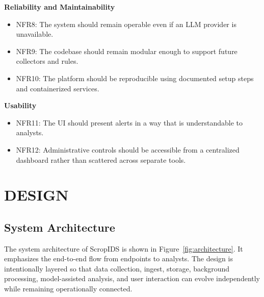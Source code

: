 \documentclass[12pt,a4paper]{article}
\begin{document}
\textbf{Reliability and Maintainability}
\begin{itemize}
    \item NFR8: The system should remain operable even if an LLM provider is unavailable.
    \item NFR9: The codebase should remain modular enough to support future collectors and rules.
    \item NFR10: The platform should be reproducible using documented setup steps and containerized services.
\end{itemize}

\textbf{Usability}
\begin{itemize}
    \item NFR11: The UI should present alerts in a way that is understandable to analysts.
    \item NFR12: Administrative controls should be accessible from a centralized dashboard rather than scattered across separate tools.
\end{itemize}

\clearpage
\section{DESIGN}

\subsection{System Architecture}
The system architecture of ScropIDS is shown in Figure~\ref{fig:architecture}. It emphasizes the end-to-end flow from endpoints to analysts. The design is intentionally layered so that data collection, ingest, storage, background processing, model-assisted analysis, and user interaction can evolve independently while remaining operationally connected.
\end{document}
